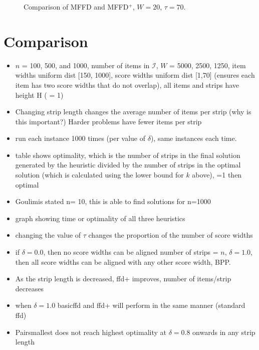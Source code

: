 \documentclass[oribibl]{llncs}
\begin{document}
\begin{figure}[h!]	
	\centering
	
	\caption{Comparison of MFFD and MFFD$^+$, $W = 20$, $\tau = 70$.}	
	\label{fig:comparestrips}
\end{figure}


\section{Comparison}
\begin{itemize}
	\item $n$ = 100, 500, and 1000, number of items in $\mathcal{I}$, $W$ = 5000, 2500, 1250, item widths uniform dist [150, 1000], score widths uniform dist [1,70] (ensures each item has two score widths that do not overlap), all items and strips have height H ( = 1)
	\item Changing strip length changes the average number of items per strip (why is this important?) Harder problems have fewer items per strip
	\item run each instance 1000 times (per value of $\delta$), same instances each time.
	\item table shows optimality, which is the number of strips in the final solution generated by the heuristic divided by the number of strips in the optimal solution (which is calculated using the lower bound for $k$ above), =1 then optimal
	\item Goulimis stated n= 10, this is able to find solutions for n=1000
	\item graph showing time or optimality of all three heuristics
	\item changing the value of $\tau$ changes the proportion of the number of score widths
	\item if $\delta = 0.0$, then no score widths can be aligned number of strips = $n$, $\delta = 1.0$, then all score widths can be aligned with any other score width, BPP.
	\item As the strip length is decreased, ffd+ improves, number of items/strip decreases
	\item when $\delta = 1.0$ basicffd and ffd+ will perform in the same manner (standard ffd)
	\item Pairsmallest does not reach highest optimality at $\delta = 0.8$ onwards in any strip length
\end{itemize}
\end{document}
